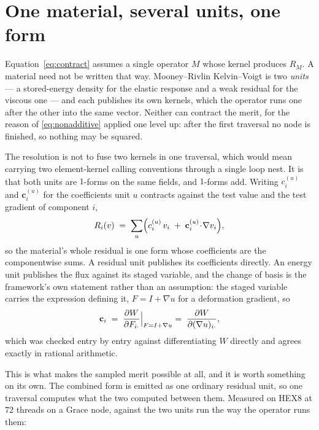 \documentclass[11pt]{article}
\begin{document}
\section{One material, several units, one form}
\label{sec:combined}

Equation~\eqref{eq:contract} assumes a single operator $M$ whose kernel produces
$R_M$.  A material need not be written that way.  Mooney--Rivlin Kelvin--Voigt is
two \emph{units} --- a stored-energy density for the elastic response and a weak
residual for the viscous one --- and each publishes its own kernels, which the
operator runs one after the other into the same vector.  Neither can contract the
merit, for the reason of \eqref{eq:nonadditive} applied one level up: after the
first traversal no node is finished, so nothing may be squared.

The resolution is not to fuse two kernels in one traversal, which would mean
carrying two element-kernel calling conventions through a single loop nest.  It
is that both units are $1$-forms on the same fields, and $1$-forms add.  Writing
$c^{(u)}_{i}$ and $\mathbf{c}^{(u)}_{i}$ for the coefficients unit $u$ contracts
against the test value and the test gradient of component $i$,
\begin{equation}
  R_i(v) \;=\; \sum_{u} \Bigl( c^{(u)}_i\,v_i
  \;+\; \mathbf{c}^{(u)}_i\!\cdot\!\nabla v_i \Bigr),
  \label{eq:formsum}
\end{equation}
so the material's whole residual is one form whose coefficients are the
componentwise sums.  A residual unit publishes its coefficients directly.  An
energy unit publishes the flux against its staged variable, and the change of
basis is the framework's own statement rather than an assumption: the staged
variable carries the expression defining it, $F = I + \nabla u$ for a deformation
gradient, so
\begin{equation}
  \mathbf{c}_i \;=\; \frac{\partial W}{\partial F_{i\cdot}}
  \Bigl|_{F = I + \nabla u}
  \;=\; \frac{\partial W}{\partial (\nabla u)_{i\cdot}} ,
\end{equation}
which was checked entry by entry against differentiating $W$ directly and agrees
exactly in rational arithmetic.

This is what makes the sampled merit possible at all, and it is worth something
on its own.  The combined form is emitted as one ordinary residual unit, so one
traversal computes what the two computed between them.  Measured on HEX8 at
$72$ threads on a Grace node, against the two units run the way the operator runs
them:
\end{document}

